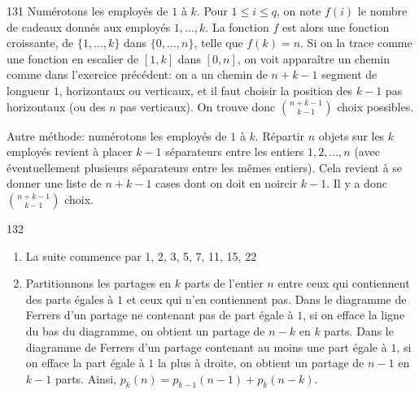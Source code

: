 \begin{Soln}{131}
Numérotons les employés de $1$ à $k$. Pour $1 \le i \le q$, on note $f(i)$ le nombre de cadeaux donnés aux employés $1, \dots,k$. La fonction $f$ est alors une fonction croissante, de $\{1, \dots,k\}$ dans $\{0, \dots,n\}$, telle que $f(k)=n$. Si on la trace comme une fonction en escalier de $[1,k]$ dans $[0,n]$, on voit apparaître un chemin comme dans l'exercice précédent: on a un chemin de $n+k-1$ segment de longueur $1$, horizontaux ou verticaux, et il faut choisir la position des $k-1$ pas horizontaux (ou des $n$ pas verticaux). On trouve donc $\binom{n+k-1}{k-1}$ choix possibles.

Autre méthode: numérotons les employés de $1$ à $k$. Répartir $n$ objets sur les $k$ employés revient à placer $k-1$ séparateurs entre les entiers $1, 2, ..., n$ (avec éventuellement plusieurs séparateurs entre les mêmes entiers). Cela revient à se donner une liste de $n+k-1$ cases dont on doit en noircir $k-1$. Il y a donc $\binom{n+k-1}{k-1}$ choix.



\end{Soln}
\begin{Soln}{132}
\begin{enumerate}
\item La suite commence par 1, 2, 3, 5, 7, 11, 15, 22
\item Partitionnons les partages en $k$ parts de l'entier $n$ entre ceux qui contiennent des parts égales à $1$ et ceux qui n'en contiennent pas. Dans le diagramme de Ferrers d'un partage ne contenant pas de part égale à $1$, si on efface la ligne du bas du diagramme, on obtient un partage de $n-k$ en $k$ parts. Dans le diagramme de Ferrers d'un partage contenant au moins une part égale à $1$, si on efface la part égale à $1$ la plus à droite, on obtient un partage de $n-1$ en $k-1$ parts. Ainsi, $p_k(n)=p_{k-1}(n-1)+p_k(n-k)$.
\end{enumerate}
\end{Soln}

